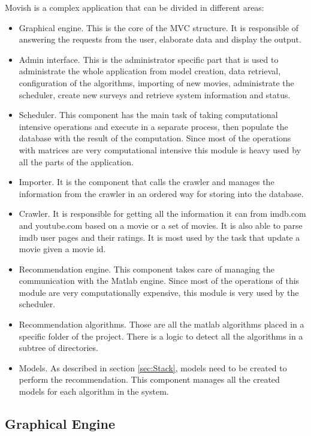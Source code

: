 Movish is a complex application that can be divided in different areas:
\begin{itemize}
\item Graphical engine. This is the core of the \ac{MVC} structure. It is responsible of answering the requests from the user, elaborate data and display the output.
\item Admin interface. This is the administrator specific part that is used to administrate the whole application from model creation, data retrieval, configuration of the algorithms, importing of new movies, administrate the scheduler, create new surveys and retrieve system information and status.
\item Scheduler. This component has the main task of taking computational intensive operations and execute in a separate process, then populate the database with the result of the computation. Since most of the operations with matrices are very computational intensive this module is heavy used by all the parts of the application.
\item Importer. It is the component that calls the crawler and manages the information from the crawler in an ordered way for storing into the database.
\item Crawler. It is responsible for getting all the information it can from imdb.com and youtube.com based on a movie or a set of movies. It is also able to parse imdb user pages and their ratings. It is most used by the task that update a movie given a movie id.
\item Recommendation engine. This component takes care of managing the communication with the Matlab engine. Since most of the operations of this module are very computationally expensive, this module is very used by the scheduler.
\item Recommendation algorithms. Those are all the matlab algorithms placed in a specific folder of the project. There is a logic to detect all the algorithms in a subtree of directories.
\item Models. As described in section \ref{sec:Stack}, models need to be created to perform the recommendation. This component manages all the created models for each algorithm in the system.
\end{itemize}

\subsection{Graphical Engine}
\label{sec:graphical-engine}

